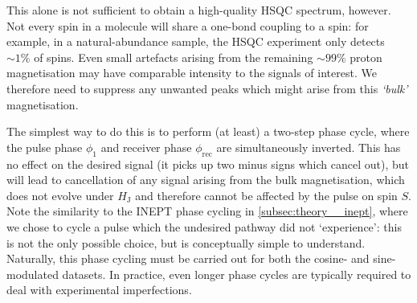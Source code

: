 This alone is not sufficient to obtain a high-quality HSQC spectrum, however.
Not every \proton{} spin in a molecule will share a one-bond coupling to a \carbon{} spin:  for example, in a natural-abundance sample, the HSQC experiment only detects $\sim 1\%$ of \proton{} spins.
Even small artefacts arising from the remaining $\sim 99\%$ proton magnetisation may have comparable intensity to the signals of interest.
We therefore need to suppress any unwanted peaks which might arise from this \textit{`bulk'} magnetisation.

The simplest way to do this is to perform (at least) a two-step phase cycle, where the pulse phase $\phi_1$ and receiver phase $\phi_\text{rec}$ are simultaneously inverted.
This has no effect on the desired signal (it picks up two minus signs which cancel out), but will lead to cancellation of any signal arising from the bulk magnetisation, which does not evolve under $H_\text{J}$ and therefore cannot be affected by the pulse on spin $S$.
Note the similarity to the INEPT phase cycling in \cref{subsec:theory__inept}, where we chose to cycle a pulse which the undesired pathway did not `experience': this is not the only possible choice, but is conceptually simple to understand.
Naturally, this phase cycling must be carried out for both the cosine- and sine-modulated datasets.
In practice, even longer phase cycles are typically required to deal with experimental imperfections.
